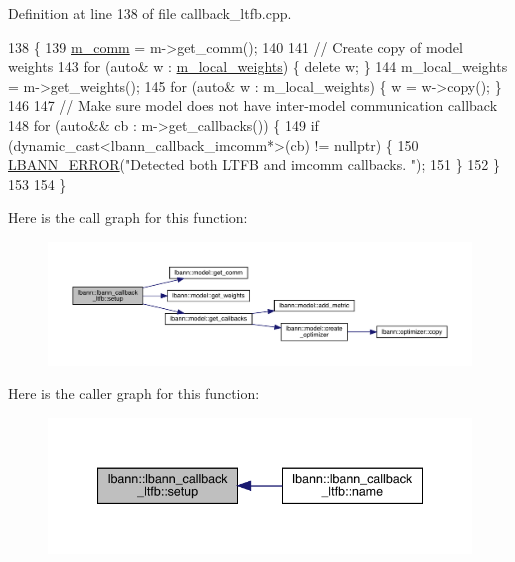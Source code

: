 Definition at line 138 of file callback\+\_\+ltfb.\+cpp.


\begin{DoxyCode}
138                                         \{
139   \hyperlink{classlbann_1_1lbann__callback__ltfb_a7536bb519c8a89b518a3196f953ac048}{m\_comm} = m->get\_comm();
140 
141   \textcolor{comment}{// Create copy of model weights}
143 \textcolor{comment}{}  \textcolor{keywordflow}{for} (\textcolor{keyword}{auto}& w : \hyperlink{classlbann_1_1lbann__callback__ltfb_a5e5b9917b9eee67b8e14c6e8f95a85a3}{m\_local\_weights}) \{ \textcolor{keyword}{delete} w; \}
144   m\_local\_weights = m->get\_weights();
145   \textcolor{keywordflow}{for} (\textcolor{keyword}{auto}& w : m\_local\_weights) \{ w = w->copy(); \}
146 
147   \textcolor{comment}{// Make sure model does not have inter-model communication callback}
148   \textcolor{keywordflow}{for} (\textcolor{keyword}{auto}&& cb : m->get\_callbacks()) \{
149     \textcolor{keywordflow}{if} (dynamic\_cast<lbann\_callback\_imcomm*>(cb) != \textcolor{keyword}{nullptr}) \{
150       \hyperlink{base_8hpp_a80b1d707117e968a6951b7222e4b2b87}{LBANN\_ERROR}(\textcolor{stringliteral}{"Detected both LTFB and imcomm callbacks. "});
151     \}
152   \}
153 
154 \}
\end{DoxyCode}
Here is the call graph for this function\+:\nopagebreak
\begin{figure}[H]
\begin{center}
\leavevmode
\includegraphics[width=350pt]{classlbann_1_1lbann__callback__ltfb_a7548166d170eda00e4e0cba6626a1a78_cgraph}
\end{center}
\end{figure}
Here is the caller graph for this function\+:\nopagebreak
\begin{figure}[H]
\begin{center}
\leavevmode
\includegraphics[width=340pt]{classlbann_1_1lbann__callback__ltfb_a7548166d170eda00e4e0cba6626a1a78_icgraph}
\end{center}
\end{figure}


